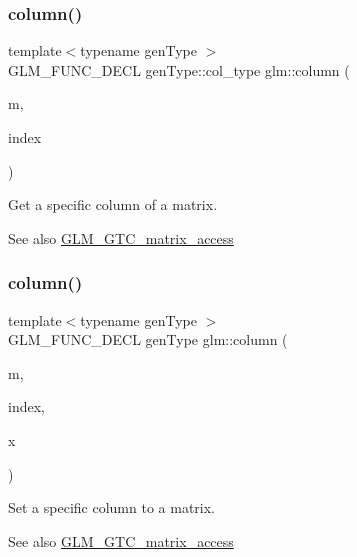 \subsubsection{\texorpdfstring{column()}{column()}\hspace{0.1cm}{\footnotesize\ttfamily [1/2]}}
{\footnotesize\ttfamily template$<$typename gen\+Type $>$ \\
G\+L\+M\+\_\+\+F\+U\+N\+C\+\_\+\+D\+E\+CL gen\+Type\+::col\+\_\+type glm\+::column (\begin{DoxyParamCaption}\item[{gen\+Type const \&}]{m,  }\item[{length\+\_\+t}]{index }\end{DoxyParamCaption})}

Get a specific column of a matrix. \begin{DoxySeeAlso}{See also}
\hyperlink{group__gtc__matrix__access}{G\+L\+M\+\_\+\+G\+T\+C\+\_\+matrix\+\_\+access} 
\end{DoxySeeAlso}
\mbox{\label{group__gtc__matrix__access_ga9e757377523890e8b80c5843dbe4dd15}} 
\subsubsection{\texorpdfstring{column()}{column()}\hspace{0.1cm}{\footnotesize\ttfamily [2/2]}}
{\footnotesize\ttfamily template$<$typename gen\+Type $>$ \\
G\+L\+M\+\_\+\+F\+U\+N\+C\+\_\+\+D\+E\+CL gen\+Type glm\+::column (\begin{DoxyParamCaption}\item[{gen\+Type const \&}]{m,  }\item[{length\+\_\+t}]{index,  }\item[{typename gen\+Type\+::col\+\_\+type const \&}]{x }\end{DoxyParamCaption})}

Set a specific column to a matrix. \begin{DoxySeeAlso}{See also}
\hyperlink{group__gtc__matrix__access}{G\+L\+M\+\_\+\+G\+T\+C\+\_\+matrix\+\_\+access} 
\end{DoxySeeAlso}
\mbox{\label{group__gtc__matrix__access_ga259e5ebd0f31ec3f83440f8cae7f5dba}} 
